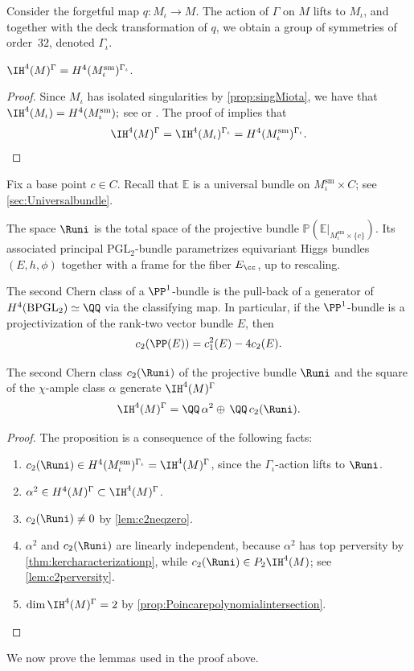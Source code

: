 Consider the forgetful map $q\colon M_{\iota} \to M$. The action of $\Gamma$ on $M$ lifts to $M_{\iota}$, and toge\-ther with the deck transformation of $q$, we obtain a group of symmetries of order~$32$, denoted $\Gamma_{\iota}$.

\begin{prop}
$\IH^4(M)^{\Gamma} = H^4(M^{\mathrm{sm}}_{\iota})^{\Gamma_{\iota}}$.
\end{prop}
\begin{proof}
Since $M_{\iota}$ has isolated singularities by \cref{prop:singMiota}, we have that
$
\IH^4(M_{\iota}) = H^4(M^{\mathrm{sm}}_{\iota});
$
see \cite[\S 1.7]{GM81} or \cite[Lem.\,1]{Durfee95}. The proof of \cite[Prop.\,3]{GottscheSoergel93} implies that
\[
\IH^4(M)^{\Gamma} = \IH^4(M_{\iota})^{\Gamma_{\iota}}= H^4(M^{\mathrm{sm}}_{\iota})^{\Gamma_{\iota}}.\qedhere
\]
\end{proof}

Fix a base point $c \in C$. Recall that $\mathbb{E}$ is a universal bundle on $M^{\mathrm{sm}}_{\iota} \times C$; see \cref{sec:Universalbundle}.

\begin{defn}
The space $\Runi$ is the total space of the projective bundle $\mathbb{P}(\mathbb{E}|_{M^{\mathrm{sm}}_{\iota} \times \{c\}})$. Its associated principal $\mathrm{PGL}_2$-bundle parametrizes equivariant Higgs bundles $(E, h, \phi)$ together with a frame for the fiber $E_{\cc}$, up to rescaling.
\end{defn}

The second Chern class of a $\PP^1$-bundle is the pull-back of a generator of $H^4(\operatorname{BPGL}_2) \simeq \QQ$ via the classifying map. In particular, if the $\PP^1$-bundle is a projectivization of the rank-two vector bundle $E$, then
\[
c_2(\PP(E))=c^2_1(E)-4c_2(E).
\]
\begin{prop}\label{prop:IH4}
The second Chern class $c_2(\Runi)$ of the projective bundle $\Runi$ and the square of the $\chi$-ample class $\alpha$ generate $\IH^4(M)^{\Gamma}$
\[
\IH^4(M)^{\Gamma}= \QQ \,\alpha^2 \oplus \,\QQ \,c_2(\Runi).
\]
\end{prop}

\begin{proof}
The proposition is a consequence of the following facts:
\begin{enumerate}
\item $c_2(\Runi) \in H^4(M^{\mathrm{sm}}_{\iota})^{\Gamma_{\iota}} = \IH^4(M)^{\Gamma}$, since the $\Gamma_{\iota}$-action lifts to $\Runi$.
\item $\alpha^2 \in H^4(M)^{\Gamma} \subset \IH^4(M)^{\Gamma}$.
\item $c_2(\Runi) \neq 0$ by \cref{lem:c2neqzero}.
\item $\alpha^2$ and $c_2(\Runi)$ are linearly independent, because $\alpha^2$ has top perversity by \cref{thm:kercharacterizationp}, while $c_2(\Runi) \in P_2 \IH^4(M)$; see \cref{lem:c2perversity}.
\item $\dim \IH^4(M)^{\Gamma} =2$ by \cref{prop:Poincarepolynomialintersection}.\qedhere
\end{enumerate}
\end{proof}
We now prove the lemmas used in the proof above.

